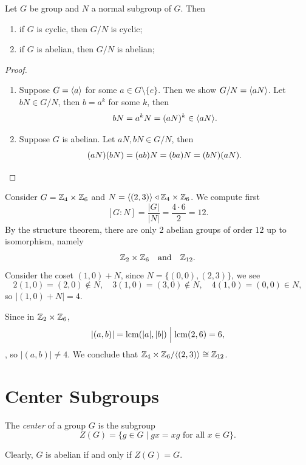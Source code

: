\begin{proposition}
  Let \(G\) be group and \(N\) a normal subgroup of \(G\). Then \begin{enumerate}
    \item if \(G\) is cyclic, then \(G/N\) is cyclic;
    \item if \(G\) is abelian, then \(G/N\) is abelian;
  \end{enumerate}
\end{proposition}
\begin{proof}
  \begin{enumerate}[label=(\alph*)]
    \item Suppose \(G = \langle a\rangle\) for some \(a\in G\setminus\{e\}\). Then we show \(G/N = \langle aN\rangle\). Let \(bN\in G/N\), then \(b = a^k\) for some \(k\), then \[
      bN = a^kN = (aN)^k \in \langle aN\rangle.
    \]
    \item Suppose \(G\) is abelian. Let \(aN, bN\in G/N\), then \[
      (aN)(bN) = (ab)N = (ba)N = (bN)(aN). \qedhere
    \]
  \end{enumerate}
\end{proof}

\begin{example}
  Consider \(G = \mathbb{Z}_4\times\mathbb{Z}_6\) and \(N = \langle(2,3)\rangle\triangleleft \mathbb{Z}_4\times\mathbb{Z}_6\).
  We compute first \[
    [G:N] = \frac{|G|}{|N|} = \frac{4\cdot 6}{2} = 12.
  \]
  By the structure theorem, there are only 2 abelian groups of order \(12\) up to isomorphism, namely \[
    \mathbb{Z}_2\times\mathbb{Z}_6 \quad\text{and}\quad \mathbb{Z}_{12}.
  \]
  Consider the coset \((1,0) + N\), since \(N = \{(0,0), (2,3)\}\), we see \[
    2(1,0) = (2,0) \notin N, \quad
    3(1,0) = (3,0) \notin N, \quad
    4(1,0) = (0,0) \in N,
  \] so \(|(1,0) + N| = 4\).

  Since in \(\mathbb{Z}_2\times\mathbb{Z}_6\), \[
    |(a,b)| = \operatorname{lcm}(|a|,|b|) \Bigm| \operatorname{lcm}(2,6) = 6,
  \], so \(|(a,b)|\neq 4\). We conclude that \(\mathbb{Z}_4\times\mathbb{Z}_6/\langle(2,3)\rangle \cong \mathbb{Z}_{12}\).
\end{example}

\section{Center Subgroups}

\begin{definition}
  The \emph{center} of a group \(G\) is the subgroup \[
    Z(G) = \{g\in G \mid gx = xg \text{ for all } x\in G\}.
  \]
\end{definition}

Clearly, \(G\) is abelian if and only if \(Z(G) = G\).

